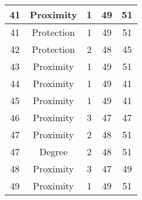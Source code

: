 \documentclass[results.tex]{subfiles}
\begin{document}
\begin{center}
\begin{tabular}{| c || c | c | c | c |}
            \hline
            41                      & Proximity                    & 1                      & 49                      & 51                   \\
            \hline
            41                      & Protection                   & 1                      & 49                      & 51                   \\
            \hline
            42                      & Protection                   & 2                      & 48                      & 45                   \\
            \hline
            43                      & Proximity                    & 1                      & 49                      & 51                   \\
            \hline
            44                      & Proximity                    & 1                      & 49                      & 41                   \\
            \hline
            45                      & Proximity                    & 1                      & 49                      & 41                   \\
            \hline
            46                      & Proximity                    & 3                      & 47                      & 47                   \\
            \hline
            47                      & Proximity                    & 2                      & 48                      & 51                   \\
            \hline
            47                      & Degree                       & 2                      & 48                      & 51                   \\
            \hline
            48                      & Proximity                    & 3                      & 47                      & 49                   \\
            \hline
            49                      & Proximity                    & 1                      & 49                      & 51                   \\
            \hline
        \end{tabular}
    \end{center}
\end{document}

